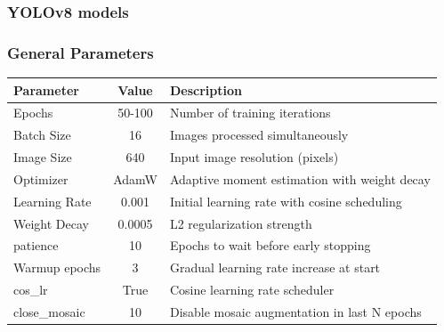 \documentclass[serif]{beamer}  %
\begin{document}
\begin{frame}
\frametitle{YOLOv8 models}
\begin{center}
\end{center}
\end{frame}

\begin{frame}
\frametitle{General Parameters}
\begin{center}
\small
\begin{tabular}{|l|c|p{5.5cm}|}
\hline
\textbf{Parameter} & \textbf{Value} & \textbf{Description} \\
\hline
Epochs & 50-100 & Number of training iterations \\
\hline
Batch Size & 16 & Images processed simultaneously \\
\hline
Image Size & 640 & Input image resolution (pixels) \\
\hline
Optimizer & AdamW & Adaptive moment estimation with weight decay \\
\hline
Learning Rate & 0.001 & Initial learning rate with cosine scheduling \\
\hline
Weight Decay & 0.0005 & L2 regularization strength \\
\hline
patience & 10 & Epochs to wait before early stopping \\
\hline
Warmup epochs & 3 & Gradual learning rate increase at start \\
\hline
cos\_lr & True & Cosine learning rate scheduler \\
\hline
close\_mosaic & 10 & Disable mosaic augmentation in last N epochs \\
\hline
\end{tabular}
\end{center}
\end{frame}
\end{document}
